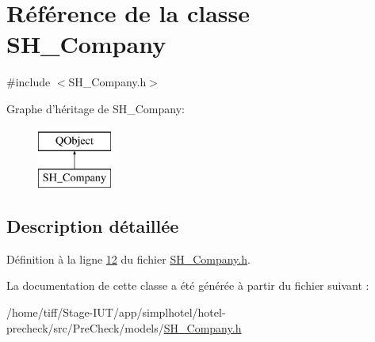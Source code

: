 \hypertarget{classSH__Company}{\section{Référence de la classe S\-H\-\_\-\-Company}
\label{classSH__Company}
}


{\ttfamily \#include $<$S\-H\-\_\-\-Company.\-h$>$}

Graphe d'héritage de S\-H\-\_\-\-Company\-:\begin{figure}[H]
\begin{center}
\leavevmode
\includegraphics[height=2.000000cm]{classSH__Company}
\end{center}
\end{figure}


\subsection{Description détaillée}


Définition à la ligne \hyperlink{SH__Company_8h_source_l00012}{12} du fichier \hyperlink{SH__Company_8h_source}{S\-H\-\_\-\-Company.\-h}.



La documentation de cette classe a été générée à partir du fichier suivant \-:\begin{DoxyCompactItemize}
\item 
/home/tiff/\-Stage-\/\-I\-U\-T/app/simplhotel/hotel-\/precheck/src/\-Pre\-Check/models/\hyperlink{SH__Company_8h}{S\-H\-\_\-\-Company.\-h}\end{DoxyCompactItemize}

